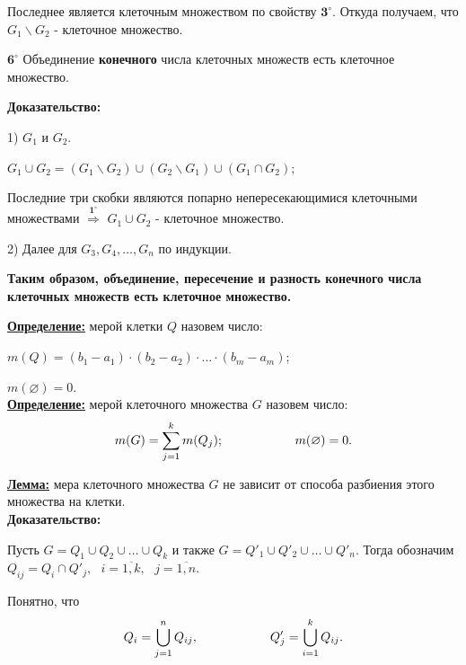 \documentclass[a4paper,12pt]{article} %
\begin{document}
Последнее является клеточным множеством по свойству $\textbf{3}^\circ$. Откуда получаем, что $G_1\backslash G_2$ - клеточное множество.

\vspace{5mm}

$\textbf{6}^\circ$ Объединение \textbf{конечного} числа клеточных множеств есть клеточное множество.

\textbf{Доказательство:}

1) $G_1$ и $G_2$.

$G_1 \cup G_2 = \left(G_1 \backslash G_2\right) \cup \left(G_2 \backslash G_1\right) \cup \left(G_1 \cap G_2\right)$;

Последние три скобки являются попарно непересекающимися клеточными множествами $\stackrel{\textbf{1}^\circ}{\Rightarrow}$ $G_1 \cup G_2$ - клеточное множество.

2) Далее для $G_3, G_4, \ldots, G_n$ по индукции.

\vspace{7mm}

\textbf{Таким образом, объединение, пересечение и разность конечного числа клеточных множеств есть клеточное множество.}

\vspace{7mm}

\underline{\textbf{Определение:}} мерой клетки $Q$ назовем число:

$m(Q) = (b_1 - a_1)\cdot (b_2 - a_2)\cdot\ldots\cdot (b_m - a_m)$;

$m(\varnothing) = 0$.\\

\underline{\textbf{Определение:}} мерой клеточного множества $G$ назовем число:
\begin{equation*}
	m(G) = \sum\limits_{j = 1}^{k} m(Q_j); \hspace{20mm} m(\varnothing) = 0.
\end{equation*}

\underline{\textbf{Лемма:}} мера клеточного множества $G$ не зависит от способа разбиения этого множества на клетки.\\

\textbf{Доказательство:}

Пусть $G = Q_1 \cup Q_2 \cup \ldots \cup Q_k$ и также $G = Q'_1 \cup Q'_2 \cup \ldots \cup Q'_n$. Тогда обозначим $Q_{ij} = Q_i \cap Q'_j, \text{ } i = \overline{1, k}, \text{ } j = \overline{1, n}.$

Понятно, что 
\begin{equation*}
	Q_i = \bigcup_{j = 1}^n Q_{ij}, \hspace{20mm} Q'_j = \bigcup_{i = 1}^k Q_{ij}.
\end{equation*}
\end{document}
